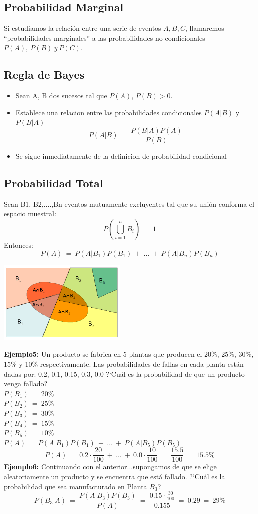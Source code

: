 \subsection{Probabilidad Marginal}
	Si estudiamos la relación entre una serie de eventos $A,B,C$, llamaremos ``probabilidades
	marginales'' a las probabilidades no condicionales $P(A),\ P(B)\ y\ P(C)$. 
\subsection{Regla de Bayes}
	\begin{itemize}
		\item Sean A, B dos sucesos tal que $P(A)$, $P(B)>0$.
		\item Establece una relacion entre las probabilidades condicionales $P(A|B)$ y $P(B|A)$
		$$P(A|B)\ =\ \frac{P(B|A)P(A)}{P(B)}$$
		\item Se sigue inmediatamente de la definicion de probabilidad condicional
	\end{itemize}
\subsection{Probabilidad Total}
	Sean B1, B2,....,Bn  eventos mutuamente excluyentes tal que su uni\'on conforma
	el espacio muestral:
	$$P(\bigcup_{i=1}^{n}B_{i})\ =\ 1$$
	Entonces:
	$$P(A)\ =\ P(A|B_{1})P(B_{1})\ +\ \ldots\ +\ P(A|B_{n})P(B_{n})$$
	\begin{center}
		\includegraphics[height=4cm]{images/cap6_5}\\
	\end{center}
	\textbf{Ejemplo5:} Un producto se fabrica en 5 plantas que producen el 20\%, 25\%, 30\%,
	 15\% y 10\% respectivamente. Las probabilidades de fallas en cada planta est\'an dadas
	por: 0.2, 0.1, 0.15, 0.3, 0.0 ?`Cu\'al es la probabilidad de que un producto venga fallado?\\
	$P(B_1)\ =\ 20\%$\\
	$P(B_2)\ =\ 25\%$\\
	$P(B_3)\ =\ 30\%$\\
	$P(B_4)\ =\ 15\%$\\
	$P(B_5)\ =\ 10\%$\\
	$P(A)\ =\ P(A|B_{1})P(B_1)\ +\ \ldots\ +\ P(A|B_5)P(B_5)$\\
	$$P(A)\ =\ 0.2\cdot \frac{20}{100}\ +\ \ldots\ +\ 0.0\cdot \frac{10}{100}\ =\ \frac{15.5}{100}\ =\ 15.5\%$$
	\textbf{Ejemplo6:} Continuando con el anterior...supongamos de que se elige aleatoriamente
	un producto y se encuentra que est\'a fallado. ?`Cu\'al es la probabilidad que sea
	manufacturado en Planta $B_3$?\\
	$$P(B_{3}|A)\ =\ \frac{P(A|B_{3})P(B_{3})}{P(A)}\ =\ \frac{0.15\cdot \frac{30}{100}}{0.155}\ =\ 0.29\ =\ 29\%$$
